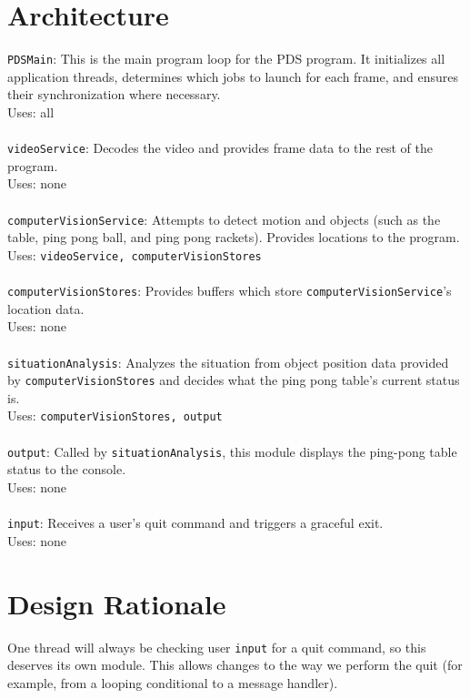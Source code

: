 \documentclass[11pt]{report}
\begin{document}
\section{Architecture}
\texttt{PDSMain}: This is the main program loop for the PDS program. It initializes all application threads, determines which jobs to launch for each frame, and ensures their synchronization where necessary.\\
Uses: all\\
\\
\texttt{videoService}: Decodes the video and provides frame data to the rest of the program.\\
Uses: none\\
\\
\texttt{computerVisionService}: Attempts to detect motion and objects (such as the table, ping pong ball, and ping pong rackets).  Provides locations to the program.\\
Uses: \texttt{videoService, computerVisionStores}\\
\\
\texttt{computerVisionStores}: Provides buffers which store \texttt{computerVisionService}'s location data.\\
Uses: none\\
\\
\texttt{situationAnalysis}: Analyzes the situation from object position data provided by \texttt{computerVisionStores} and decides what the ping pong table's current status is.\\
Uses: \texttt{computerVisionStores, output}\\
\\
\texttt{output}: Called by \texttt{situationAnalysis}, this module displays the ping-pong table status to the console.\\
Uses: none\\
\\
\texttt{input}: Receives a user's quit command and triggers a graceful exit.\\
Uses: none\\

\section{Design Rationale}
One thread will always be checking user \texttt{input} for a quit command, so this deserves its own module.  This allows changes to the way we perform the quit (for example, from a looping conditional to a message handler).  
\end{document}
